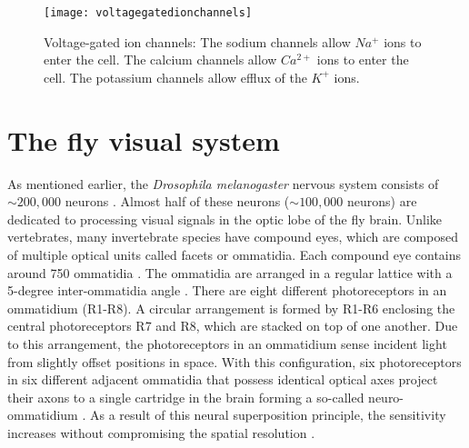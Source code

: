 \begin{figure}
\centering
\hspace*{-1cm} 
\texttt{[image: voltagegatedionchannels]}
\caption[Voltage-gated ion channels] {Voltage-gated ion channels: The sodium channels allow $Na^{+}$ ions to enter the cell. The calcium channels allow $Ca^{2+}$ ions to enter the cell. The potassium channels allow efflux of the $K^{+}$ ions.}
\label{fig:vgatedionc}
\end{figure}


\section{The fly visual system}

As mentioned earlier, the \textit{Drosophila melanogaster} nervous system consists of ${\sim}200,000$ neurons \parencite{Raji2021}. Almost half of these neurons (${\sim}100,000$ neurons) are dedicated to processing visual signals in the optic lobe of the fly brain. Unlike vertebrates, many invertebrate species have compound eyes, which are composed of multiple optical units called facets or ommatidia. Each compound eye contains around 750 ommatidia \parencite{Ready1976}. The ommatidia are arranged in a regular lattice with a 5-degree inter-ommatidia angle \parencite{Land1997}. There are eight different photoreceptors in an ommatidium (R1-R8). A circular arrangement is formed by R1-R6 enclosing the central photoreceptors R7 and R8, which are stacked on top of one another. Due to this arrangement, the photoreceptors in an ommatidium sense incident light from slightly offset positions in space. With this configuration, six photoreceptors in six different adjacent ommatidia that possess identical optical axes project their axons to a single cartridge in the brain forming a so-called neuro-ommatidium \parencite{Strausfeld1971}. As a result of this neural superposition principle, the sensitivity increases without compromising the spatial resolution \parencite{Kirschfeld1967}.


